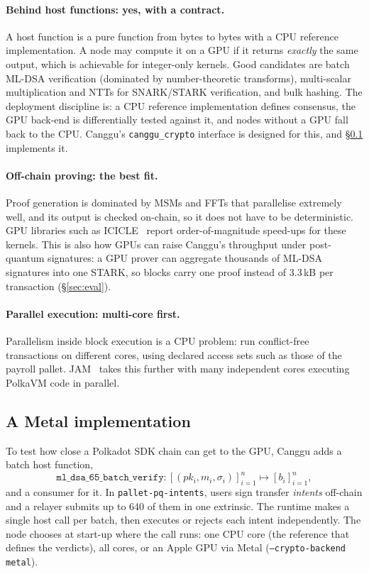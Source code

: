 \documentclass[11pt]{article}
\theoremstyle{definition}
\theoremstyle{remark}
\begin{document}
\paragraph{Behind host functions: yes, with a contract.} A host function is a pure function from
bytes to bytes with a CPU reference implementation. A node may compute it on a GPU if it returns
\emph{exactly} the same output, which is achievable for integer-only kernels. Good candidates are
batch ML-DSA verification (dominated by number-theoretic transforms), multi-scalar multiplication
and NTTs for SNARK/STARK verification, and bulk hashing. The deployment discipline is: a CPU
reference implementation defines consensus, the GPU back-end is differentially tested against it,
and nodes without a GPU fall back to the CPU. Canggu's \texttt{canggu\_crypto} interface is designed
for this, and \S\ref{sec:metal} implements it.

\paragraph{Off-chain proving: the best fit.} Proof generation is dominated by MSMs and FFTs that
parallelise extremely well, and its output is checked on-chain, so it does not have to be
deterministic. GPU libraries such as ICICLE~\cite{icicle} report order-of-magnitude speed-ups for
these kernels. This is also how GPUs can raise Canggu's throughput under post-quantum signatures:
a GPU prover can aggregate thousands of ML-DSA signatures into one STARK, so blocks carry one proof
instead of 3.3\,kB per transaction (\S\ref{sec:eval}).

\paragraph{Parallel execution: multi-core first.} Parallelism inside block execution is a CPU
problem: run conflict-free transactions on different cores, using declared access sets such as
those of the payroll pallet. JAM~\cite{graypaper} takes this further with many independent cores
executing PolkaVM code in parallel.

\subsection{A Metal implementation}
\label{sec:metal}

To test how close a Polkadot SDK chain can get to the GPU, Canggu adds a batch host function,
\[
\texttt{ml\_dsa\_65\_batch\_verify}\colon [(pk_i, m_i, \sigma_i)]_{i=1}^{n} \mapsto [b_i]_{i=1}^{n},
\]
and a consumer for it. In \texttt{pallet-pq-intents}, users sign transfer \emph{intents} off-chain
and a relayer submits up to 640 of them in one extrinsic. The runtime makes a single host call per
batch, then executes or rejects each intent independently. The node chooses at start-up where the
call runs: one CPU core (the reference that defines the verdicts), all cores, or an Apple GPU via
Metal (\texttt{--crypto-backend metal}).
\end{document}
